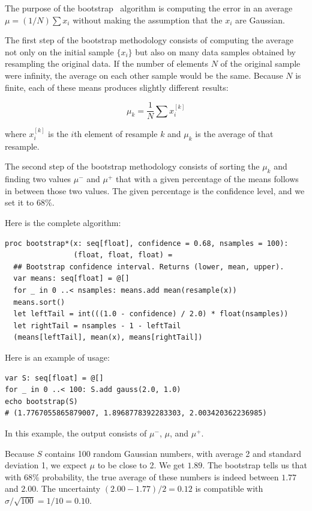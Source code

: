 \documentclass[justified, sixbynine]{tufte-book}
\def\ft{\small\tt}
\theoremstyle{plain}%
\newtheorem * {corollary}{Corollary}
\theoremstyle{definition}
\theoremstyle{remark}
\newtheorem * {remark}{Remark}
\newtheorem * {note}{Note}
\begin{document}
\begin{fullwidth}

The purpose of the bootstrap~\cite{bootstrap} algorithm is computing the error in an average $\mu = (1/N) \sum x_i$ without making the assumption that the $x_i$ are Gaussian.

The first step of the bootstrap methodology consists of computing the average not only on the initial sample $\{x_i\}$ but also on many data samples obtained by resampling the original data. If the number of elements $N$ of the original sample were infinity, the average on each other sample would be the same. Because $N$ is finite, each of these means produces slightly different results:

\begin{equation}
\mu_k = \frac1N \sum x^{[k]}_i
\end{equation}

where $x^{[k]}_i$ is the $i$th element of resample $k$ and $\mu_k$ is the average of that resample.

The second step of the bootstrap methodology consists of sorting the $\mu_k$ and finding two values $\mu^-$ and $\mu^+$ that with a given percentage of the means follows in between those two values. The given percentage is the confidence level, and we set it to $68\%$.

Here is the complete algorithm:

\begin{lstlisting}[caption={in file: {\ft nlib/montecarlo.nim}}]
proc bootstrap*(x: seq[float], confidence = 0.68, nsamples = 100):
                (float, float, float) =
  ## Bootstrap confidence interval. Returns (lower, mean, upper).
  var means: seq[float] = @[]
  for _ in 0 ..< nsamples: means.add mean(resample(x))
  means.sort()
  let leftTail = int(((1.0 - confidence) / 2.0) * float(nsamples))
  let rightTail = nsamples - 1 - leftTail
  (means[leftTail], mean(x), means[rightTail])
\end{lstlisting}

Here is an example of usage:

\begin{lstlisting}
var S: seq[float] = @[]
for _ in 0 ..< 100: S.add gauss(2.0, 1.0)
echo bootstrap(S)
# (1.7767055865879007, 1.8968778392283303, 2.003420362236985)
\end{lstlisting}

In this example, the output consists of $\mu^-$, $\mu$, and $\mu^+$.

Because $S$ contains 100 random Gaussian numbers, with average 2 and standard deviation 1, we expect $\mu$ to be close to 2. We get $1.89$. The bootstrap tells us that with 68\% probability, the true average of these numbers is indeed between $1.77$ and $2.00$. The uncertainty $(2.00-1.77)/2 = 0.12$ is compatible with $\sigma/\sqrt{100} = 1/10 = 0.10$.


\end{fullwidth}
\end{document}
